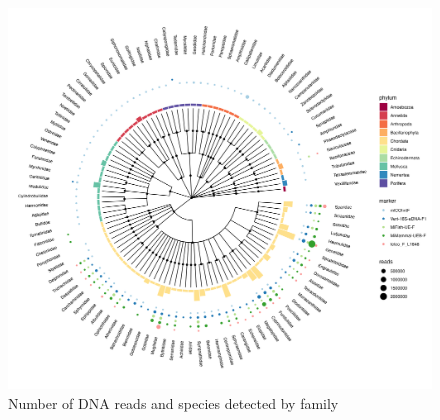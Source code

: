 \documentclass[10pt]{article}
\begin{document}
\clearpage





\clearpage

%

\begin{figure}[h!]
\centering
\includegraphics[width=\textwidth]{tree}
\caption{Number of DNA reads and species detected by family}
\end{figure}

\clearpage
\end{document}
